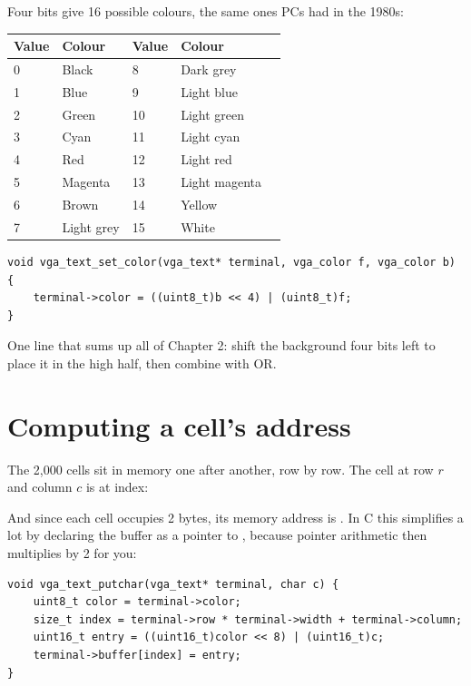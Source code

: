 Four bits give 16 possible colours, the same ones PCs had in the 1980s:

\begin{center}
\begin{tabularx}{0.95\textwidth}{@{}llllX@{}}
\toprule
\textbf{Value} & \textbf{Colour} & \textbf{Value} & \textbf{Colour} & \\
\midrule
0 & Black      & 8  & Dark grey \\
1 & Blue       & 9  & Light blue \\
2 & Green      & 10 & Light green \\
3 & Cyan       & 11 & Light cyan \\
4 & Red        & 12 & Light red \\
5 & Magenta    & 13 & Light magenta \\
6 & Brown      & 14 & Yellow \\
7 & Light grey & 15 & White \\
\bottomrule
\end{tabularx}
\end{center}

\begin{lstlisting}[style=c]
void vga_text_set_color(vga_text* terminal, vga_color f, vga_color b) {
    terminal->color = ((uint8_t)b << 4) | (uint8_t)f;
}
\end{lstlisting}

One line that sums up all of Chapter 2: shift the background four bits left to place it in the high
half, then combine with OR.

\section{Computing a cell's address}

The 2,000 cells sit in memory one after another, row by row. The cell at row $r$ and column $c$ is
at index:

\begin{center}
\end{center}

And since each cell occupies 2 bytes, its memory address is . In C
this simplifies a lot by declaring the buffer as a pointer to , because pointer
arithmetic then multiplies by 2 for you:

\begin{lstlisting}[style=c]
void vga_text_putchar(vga_text* terminal, char c) {
    uint8_t color = terminal->color;
    size_t index = terminal->row * terminal->width + terminal->column;
    uint16_t entry = ((uint16_t)color << 8) | (uint16_t)c;
    terminal->buffer[index] = entry;
}
\end{lstlisting}

